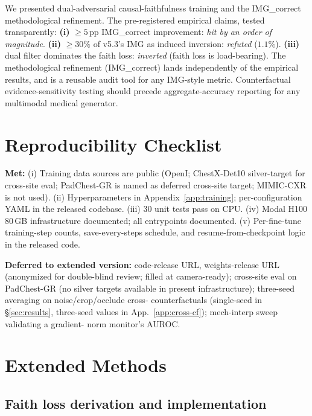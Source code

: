 \documentclass{article}
\begin{document}
We presented dual-adversarial causal-faithfulness training and the
IMG\_correct methodological refinement. The pre-registered
empirical claims, tested transparently: \textbf{(i)} $\geq 5$\,pp
IMG\_correct improvement: \emph{hit by an order of magnitude}.
\textbf{(ii)} $\geq 30\%$ of v5.3's IMG as induced inversion:
\emph{refuted} ($1.1\%$). \textbf{(iii)} dual filter dominates the
faith loss: \emph{inverted} (faith loss is load-bearing). The
methodological refinement (IMG\_correct) lands independently of the
empirical results, and is a reusable audit tool for any IMG-style
metric. Counterfactual evidence-sensitivity testing should precede
aggregate-accuracy reporting for any multimodal medical generator.




\appendix

\section{Reproducibility Checklist}
\label{app:repro}

\textbf{Met:} (i) Training data sources are public (OpenI; ChestX-Det10
silver-target for cross-site eval; PadChest-GR is named as deferred
cross-site target; MIMIC-CXR is not used). (ii) Hyperparameters in
Appendix~\ref{app:training}; per-configuration YAML in the released
codebase. (iii) $30$ unit tests pass on CPU. (iv) Modal H100 80\,GB
infrastructure documented; all entrypoints documented.
(v) Per-fine-tune training-step counts, save-every-steps schedule, and
resume-from-checkpoint logic in the released code.

\textbf{Deferred to extended version:} code-release URL, weights-release
URL (anonymized for double-blind review; filled at camera-ready);
cross-site eval on PadChest-GR (no silver targets available in present
infrastructure); three-seed averaging on noise/crop/occlude cross-
counterfactuals (single-seed in \S\ref{sec:results}, three-seed values
in App.~\ref{app:cross-cf}); mech-interp sweep validating a gradient-
norm monitor's AUROC.

\section{Extended Methods}
\label{app:methods}

\subsection{Faith loss derivation and implementation}
\label{app:faith}
\end{document}
